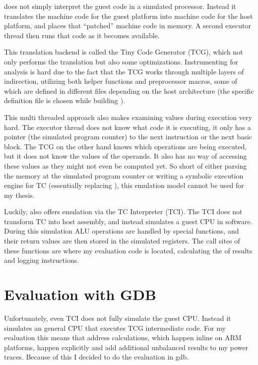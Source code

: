 \qemu{} does not simply interpret the guest code in a simulated processor.
Instead it translates the machine code for the guest platform into machine code for the host platform, and places that ``patched'' machine code in memory.
A second executor thread then runs that code as it becomes available.

This translation backend is called the Tiny Code Generator (TCG), which not only performs the translation but also some optimizations.
Instrumenting \qemu{} for analysis is hard due to the fact that the TCG works through multiple layers of indirection, utilizing both helper functions and preprocessor macros, some of which are defined in different files depending on the host architecture (the specific definition file is chosen while building \qemu{}).

This multi threaded approach also makes examining values during execution very hard.
The executor thread does not know what code it is executing, it only has a pointer (the simulated program counter) to the next instruction or the next basic block.
The TCG on the other hand knows which operations are being executed, but it does not know the values of the operands.
It also has no way of accessing these values as they might not even be computed yet.
So short of either parsing the memory at the simulated program counter or writing a symbolic execution engine for TC (essentially replacing \qemu{}), this emulation model cannot be used for my thesis.

Luckily, \qemu{} also offers emulation via the TC Interpreter (TCI).
The TCI does not transform TC into host assembly, and instead simulates a guest CPU in software.
During this simulation ALU operations are handled by special functions, and their return values are then stored in the simulated registers.
The call sites of these functions are where my evaluation code is located, calculating the \hammingw{} of results and logging instructions.

\section{Evaluation with GDB}
Unfortunately, even TCI does not fully simulate the guest CPU.
Instead it simulates an general CPU that executes TCG intermediate code.
For my evaluation this means that address calculations, which happen inline on ARM platforms, happen explicitly and add additional unbalanced results to my power traces.
Because of this I decided to do the evaluation in gdb.

